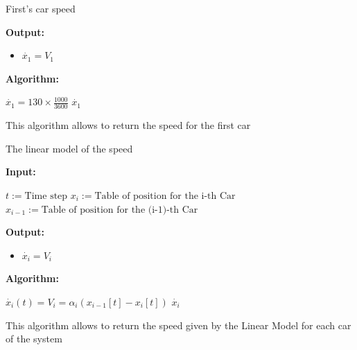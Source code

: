 \documentclass{article}
\begin{document}
			\begin{algorithm}[H]
				\caption{First's car speed}\label{alg:x1_dot}
				\begin{algorithmic}
					\State \textbf{Output:} \\
					\begin{itemize}[]
						\item $\dot{x_1}=V_1$
					\end{itemize}
					\State \textbf{Algorithm:} \\
					\begin{itemize}[]
						\State $\dot{x_1}=130 \times \frac{1000}{3600}$ 
						\State \Return $\dot{x_1}$ 
					\end{itemize}		
				\end{algorithmic}
			\end{algorithm}
			This algorithm allows to return the speed for the first car
			\begin{algorithm}[H]
				\caption{The linear model of the speed}\label{alg:xi_dot}
				\begin{algorithmic}
					\State \textbf{Input:} \\
					\begin{itemize}
					\State $t:=\text{Time  step}$
					\State$x_i:=\text{Table of position for the i-th Car}$
					\State$x_{i-1}:=\text{Table of position for the (i-1)-th Car}$
					\end{itemize}
					\State \textbf{Output:} \\
					\begin{itemize}[]
						\item $\dot{x_i}=V_i$
					\end{itemize}
					\State \textbf{Algorithm:} \\
					\begin{itemize}[]
						\State $\dot{x_i}(t) = V_i = \alpha_i(x_{i-1}[t] - x_i[t])$ 
						\State \Return $\dot{x_i}$ 
					\end{itemize}		
				\end{algorithmic}
			\end{algorithm}
			
			This algorithm allows to return the speed given by the Linear Model for each car of the system
			
\end{document}
